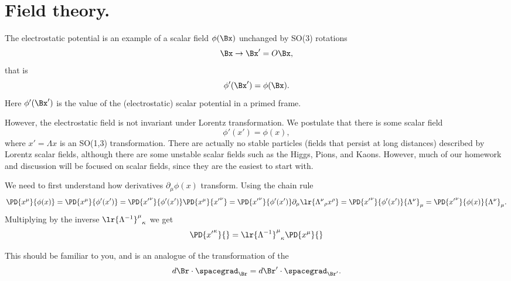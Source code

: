 %
%
\section{Field theory.}

The electrostatic potential is an example of a scalar field \( \phi(\Bx) \) unchanged by SO(3) rotations
\begin{equation}\label{eqn:qftLecture3:240}
\Bx \rightarrow \Bx' = O \Bx,
\end{equation}
that is
\begin{dmath}\label{eqn:qftLecture3:260}
\phi'(\Bx') = \phi(\Bx).
\end{dmath}
Here \( \phi'(\Bx') \) is the value of the (electrostatic) scalar potential in a primed frame.

However, the electrostatic field is not invariant under Lorentz transformation.
We postulate that there is some scalar field
\begin{dmath}\label{eqn:qftLecture3:280}
\phi'(x') = \phi(x),
\end{dmath}
where \( x' = \Lambda x \) is an SO(1,3) transformation.
There are actually no stable particles (fields that persist at long distances) described by Lorentz scalar fields, although there are some unstable scalar fields such as the
Higgs, Pions, and Kaons.
However,
much of our homework and discussion will be focused on scalar fields, since
they are the
easiest to start with.

We need to first understand how derivatives \( \partial_\mu \phi(x) \) transform.  Using the chain rule
\begin{dmath}\label{eqn:qftLecture3:300}
\PD{x^\mu}{\phi(x)} =
\PD{x^\mu}{\phi'(x')}
=
\PD{{x'}^\nu}{\phi'(x')}
\PD{{x}^\mu}{{x'}^\nu}
=
\PD{{x'}^\nu}{\phi'(x')}
\partial_\mu \lr{
{\Lambda^\nu}_\rho x^\rho
}
=
\PD{{x'}^\nu}{\phi'(x')}
{\Lambda^\nu}_\mu
=
\PD{{x'}^\nu}{\phi(x)}
{\Lambda^\nu}_\mu.
\end{dmath}
Multiplying by the inverse \( {\lr{\Lambda^{-1}}^\mu}_\kappa \) we get
\begin{dmath}\label{eqn:qftLecture3:320}
\PD{{x'}^\kappa}{}
=
{\lr{\Lambda^{-1}}^\mu}_\kappa \PD{x^\mu}{}
\end{dmath}

This should be familiar to you, and is an analogue of the transformation of the
\begin{dmath}\label{eqn:qftLecture3:340}
d\Br \cdot \spacegrad_\Br
=
d\Br' \cdot \spacegrad_{\Br'}.
\end{dmath}

